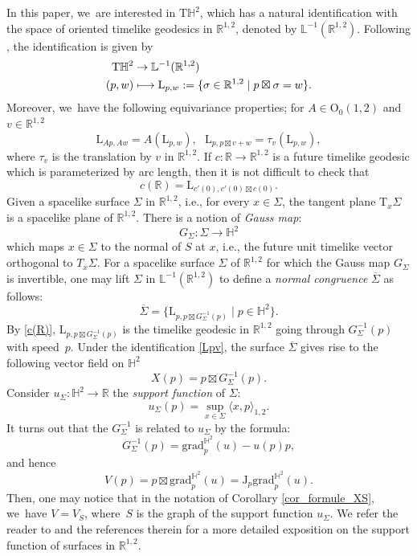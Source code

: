 \documentclass[11pt]{article}
\newcommand{\ie}{i.e.,\xspace}
\newcommand\mto{\mathchoice{\longmapsto}{\mapsto}{\mapsto}{\mapsto}}
\theoremstyle{plain}
\theoremstyle{definition}
\newcommand{\minko}{\mathbb{R}^{1,2}}
\newcommand{\grad}{\mathrm{grad}^{\mathbb{H}^2}}
\newcommand{\J}{\mathrm{J}}
\newcommand{\inner}[1] {\langle #1 \rangle}
\begin{document}
In this paper, we~are interested in $\mathrm{T}\mathbb{H}^2$, which has a natural identification with the space of oriented timelike geodesics in $\minko$, denoted by $\mathbb{L}^{-1}(\minko)$. Following \cite[\S 6.6]{DGK_complete_lorentz}, the identification is given by
\begin{equation}\label{Lpv}
\begin{aligned}
\mathrm{T}\mathbb{H}^2 & \to \mathbb{L}^{-1}(\minko) \\
(p,w) & \mto \mathrm{L}_{p,w}:=\{\sigma\in\minko \mid p\boxtimes\sigma=w\}.
\end{aligned}
\end{equation}
Moreover, we~have the following equivariance properties; for $A\in \mathrm{O}_0(1,2)$ and $v\in\minko$
\begin{equation}
\mathrm{L}_{Ap,Aw}=A(\mathrm{L}_{p,w}),\ \ \ \mathrm{L}_{p,p\boxtimes v+w}=\tau_v(\mathrm{L}_{p,w}),
\end{equation} where $\tau_v$ is the translation by $v$ in $\minko$.
If $c:\mathbb{R}\to\minko$ is a future timelike geodesic which is parameterized by arc length, then it is not difficult to check that
\begin{equation}\label{c(R)}
c(\mathbb{R})=\mathrm{L}_{c'(0),c'(0)\boxtimes c(0)}.
\end{equation}
Given a spacelike surface $\Sigma$ in $\minko$, \ie for every $x\in\Sigma$, the tangent plane $\mathrm{T}_x\Sigma$ is a spacelike plane of $\minko$. There is a notion of \emph{Gauss map}:
\[
G_{\Sigma}:\Sigma\to\mathbb{H}^2
\]
which maps $x\in\Sigma$ to the normal of $S$ at $x$, \ie the future unit timelike vector orthogonal to $T_x\Sigma$. For a spacelike surface $\Sigma$ of $\minko$ for which the Gauss map $G_{\Sigma}$ is invertible, one may lift $\Sigma$ in $\mathbb{L}^{-1}(\minko)$ to define a \emph{normal congruence} $\overline{\Sigma}$ as follows:
\begin{equation}
\overline{\Sigma}=\{\mathrm{L}_{p,p\boxtimes G^{-1}_{\Sigma}(p)}\mid p\in\mathbb{H}^2\}.
\end{equation}
By \eqref{c(R)}, $\mathrm{L}_{p,p\boxtimes G^{-1}_{\Sigma}(p)}$ is the timelike geodesic in $\minko$ going through $G_{\Sigma}^{-1}(p)$ with speed~$p$.
Under the identification \eqref{Lpv}, the surface $\overline{\Sigma}$ gives rise to the following vector field on $\mathbb{H}^2$
\[
X(p)=p\boxtimes G_{\Sigma}^{-1}(p).
\]
Consider $u_{\Sigma}:\mathbb{H}^2\to\mathbb{R}$ the \emph{support function} of $\Sigma$:
\[
u_{\Sigma}(p)=\sup_{x\in\Sigma}\inner{x,p}_{1,2}.
\]It turns out that the $G_{\Sigma}^{-1}$ is related to $u_{\Sigma}$ by the formula:
\[
G_{\Sigma}^{-1}(p)=\grad_p(u)-u(p)p,
\]
and hence
\[
V(p)=p\boxtimes \grad_p(u)=\J_p\grad_p(u).
\]
Then, one may notice that in the notation of Corollary \ref{cor_formule_XS}, we~have $V=V_S$, where~$S$ is the graph of the support function $u_{\Sigma}$.
We refer the reader to \cite{BS17} and the references therein for a more detailed exposition on the support function of surfaces in $\minko$.
\end{document}
